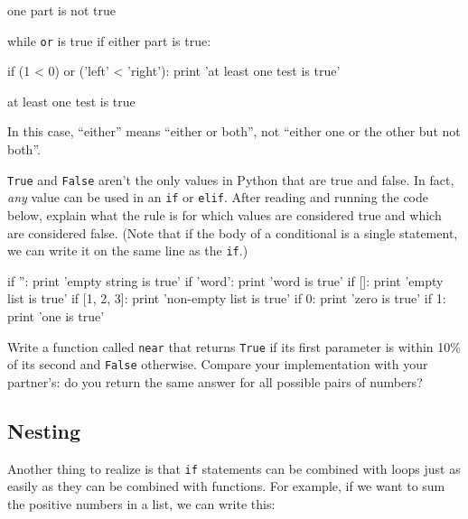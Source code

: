\documentclass{book}
\begin{document}
\begin{VerbOut}
one part is not true
\end{VerbOut}

while \texttt{or} is true if either part is true:

\begin{VerbIn}
if (1 < 0) or ('left' < 'right'):
    print 'at least one test is true'
\end{VerbIn}

\begin{VerbOut}
at least one test is true
\end{VerbOut}

In this case, ``either'' means ``either or both'', not ``either one or
the other but not both''.

\begin{challenge}
  \texttt{True} and \texttt{False} aren't the only values in Python that
  are true and false. In fact, \emph{any} value can be used in an
  \texttt{if} or \texttt{elif}. After reading and running the code
  below, explain what the rule is for which values are considered true
  and which are considered false. (Note that if the body of a
  conditional is a single statement, we can write it on the same line as
  the \texttt{if}.)

\begin{VerbIn}
if '': print 'empty string is true'
if 'word': print 'word is true'
if []: print 'empty list is true'
if [1, 2, 3]: print 'non-empty list is true'
if 0: print 'zero is true'
if 1: print 'one is true'
\end{VerbIn}
\end{challenge}

\begin{challenge}
  Write a function called \texttt{near} that returns \texttt{True} if
  its first parameter is within 10\% of its second and \texttt{False}
  otherwise. Compare your implementation with your partner's: do you
  return the same answer for all possible pairs of numbers?
\end{challenge}

\subsection{Nesting}

Another thing to realize is that \texttt{if} statements can be combined
with loops just as easily as they can be combined with functions. For
example, if we want to sum the positive numbers in a list, we can write
this:
\end{document}
